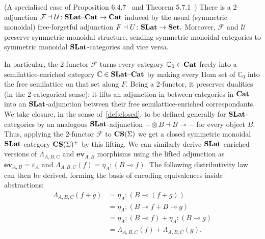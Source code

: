 \begin{proposition}(A specialised case of Proposition 6.4.7~\cite{Borceux_1994} and Theorem 5.7.1~\cite{cruttwell2008normed})
	There is a 2-adjunction
	\(
	\mathcal{F} \dashv \mathcal{U}\colon \mathbf{SLat}\text{--}\mathbf{Cat} \to \mathbf{Cat}
	\)
	induced by the usual (symmetric monoidal) free-forgetful adjunction
	\(
	F \dashv U\colon \mathbf{SLat} \to \mathbf{Set}.
	\)
	Moreover, $\mathcal{F}$ and $\mathcal{U}$ preserve symmetric monoidal structure, sending symmetric monoidal categories to symmetric monoidal $\mathbf{SLat}$-categories and vice versa.
\end{proposition}
In particular, the 2-functor $\mathcal{F}$ turns every category $\mathbb{C}_0 \in \mathbf{Cat}$ freely into a semilattice-enriched category $\mathbb{C} \in \mathbf{SLat}\text{--}\mathbf{Cat}$ by making every Hom set of $\mathbb{C}_0$ into the free semilattice on that set along $F$.
Being a 2-functor, it preserves dualities (in the 2-categorical sense): it lifts an adjunction in between categories in $\mathbf{Cat}$ into an $\mathbf{SLat}$-adjunction between their free semilattice-enriched correspondants.
We take closure, in the sense of~\autoref{def:closed}, to be defined generally for $\mathbf{SLat}$-categories by an analogous $\mathbf{SLat}$-adjunction $- \otimes B \dashv B \multimap -$ for every object $B$.
Thus, applying the 2-functor $\mathcal{F}$ to $\mathbf{CS}(\Sigma)$ we get a closed symmetric monoidal $\mathbf{SLat}$-category $\mathbf{CS}(\Sigma)^{+}$ by this lifting.
We can similarly derive $\mathbf{SLat}$-enriched versions of  $\Lambda_{A,B,C}$ and $\textbf{ev}_{A,B}$ morphisms using the lifted adjunction as $\textbf{ev}_{A,B} = \varepsilon_{A}$ and $\Lambda_{A,B,C}(f) = \eta_A; (B \multimap{} f)$.
The following distributivity law can then be derived, forming the basis of encoding equivalences inside abstractions:
\begin{equation}
	\begin{aligned}
		\Lambda_{A,B,C}(f + g) & = \eta_A;(B \multimap (f + g))                    \\
		                       & = \eta_A;(B \multimap f + B \multimap g)          \\
		                       & = \eta_A;(B \multimap f) + \eta_A;(B \multimap g) \\
		                       & = \Lambda_{A,B,C}(f) + \Lambda_{A,B,C}(g).
	\end{aligned}%
	\label{law:distributivity}
\end{equation}

